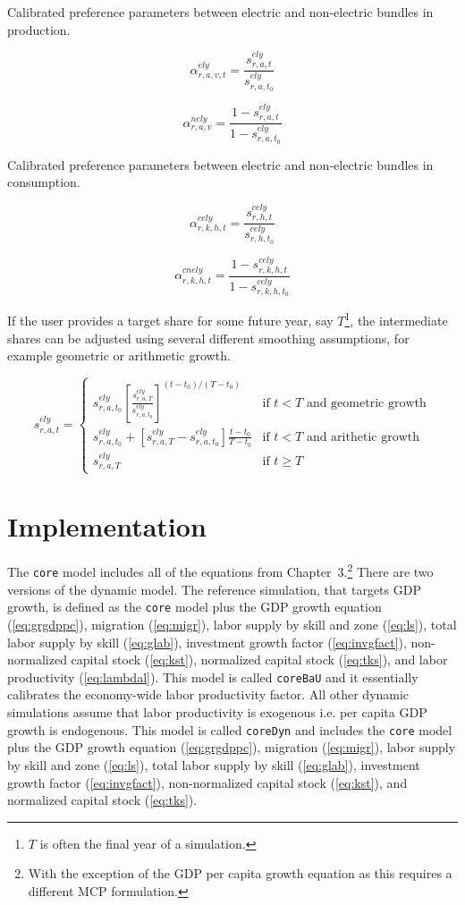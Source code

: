 \documentclass[11pt,letterpaper]{report}
\begin{document}
Calibrated preference parameters between electric and
non-electric bundles in production.

\[
\alpha^{\mathit{ely}}_{\mathit{r,a,v,t}}
= \frac{s^{\mathit{ely}}_{r,a,t}}{s^{\mathit{ely}}_{r,a,t_0}}
\]

\[
\alpha^{\mathit{nely}}_{\mathit{r,a,v}}
= \frac{1-s^{\mathit{ely}}_{r,a,t}}{1-s^{\mathit{ely}}_{r,a,t_0}}
\]

\noindent Calibrated preference parameters between electric and
non-electric bundles in consumption.

\[
 \alpha^{\mathit{cely}}_{\mathit{r,k,h,t}}
= \frac{s^{\mathit{cely}}_{r,h,t}}{s^{\mathit{cely}}_{r,h,t_0}}
\]

\[
\alpha^{\mathit{cnely}}_{\mathit{r,k,h,t}}
= \frac{1-s^{\mathit{cely}}_{r,k,h,t}}{1-s^{\mathit{cely}}_{r,k,h,t_0}}
\]

If the user provides a target share for some future year, say $T$\footnote{$T$ is often the final year of a simulation.}, the intermediate shares can be adjusted using several different
smoothing assumptions, for example geometric or arithmetic growth.

\[
s^{\mathit{ely}}_{r,a,t} =
\begin{cases}
s^{\mathit{ely}}_{r,a,t_0}
\left[\frac{s^{\mathit{ely}}_{r,a,T}}{s^{\mathit{ely}}_{r,a,t_0}}
\right]^{(t-t_0)/(T-t_0)} & \textrm{if } t < T \textrm{ and geometric growth} \\
s^{\mathit{ely}}_{r,a,t_0} +
\left[{s^{\mathit{ely}}_{r,a,T}}-{s^{\mathit{ely}}_{r,a,t_0}}
\right]
\displaystyle \frac{t-t_0}{T-t_0} & \textrm{if } t < T \textrm{ and arithetic growth} \\
s^{\mathit{ely}}_{r,a,T} & \textrm{if } t \ge T
\end{cases}
\]

\section{Implementation}

The \texttt{core} model includes all of the equations from
Chapter~3.\footnote{With the exception of the GDP per capita growth equation as
this requires a different MCP formulation.} There are two versions of the
dynamic model. The reference simulation, that targets GDP growth, is defined as
the \texttt{core} model plus the GDP growth equation (\ref{eq:grgdppc}),
migration (\ref{eq:migr}), labor supply by skill and zone (\ref{eq:ls}), total
labor supply by skill (\ref{eq:glab}), investment growth factor
(\ref{eq:invgfact}), non-normalized capital stock (\ref{eq:kst}), normalized
capital stock (\ref{eq:tks}), and labor productivity (\ref{eq:lambdal}). This
model is called \texttt{coreBaU} and it essentially calibrates the economy-wide
labor productivity factor. All other dynamic simulations assume that labor
productivity is exogenous i.e. per capita GDP growth is endogenous. This model
is called \texttt{coreDyn} and includes the \texttt{core} model plus the GDP
growth equation (\ref{eq:grgdppc}), migration (\ref{eq:migr}), labor supply by
skill and zone (\ref{eq:ls}), total labor supply by skill (\ref{eq:glab}),
investment growth factor (\ref{eq:invgfact}), non-normalized capital stock
(\ref{eq:kst}), and normalized capital stock (\ref{eq:tks}).
\end{document}
